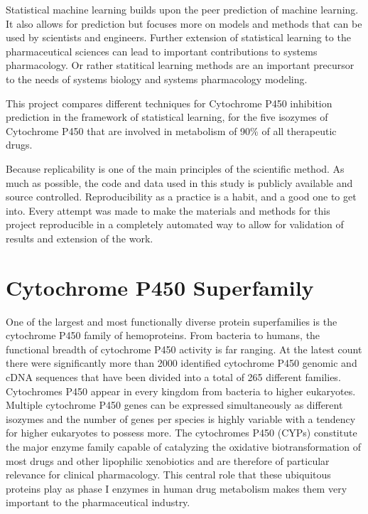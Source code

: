Statistical machine learning builds upon the peer prediction of machine learning. It also allows for prediction but focuses more on models and methods that can be used by scientists and engineers. \cite{James2013} Further extension of statistical learning to the pharmaceutical sciences can lead to important contributions to systems pharmacology. Or rather statitical learning methods are an important precursor to the needs of systems biology and systems pharmacology modeling.

This project compares different techniques for Cytochrome P450 inhibition prediction in the framework of statistical learning, for the five isozymes of Cytochrome P450 that are involved in metabolism of 90\% of all therapeutic drugs.

Because replicability is one of the main principles of the scientific method. As much as possible, the code and data used in this study is publicly available and source controlled. Reproducibility as a practice is a habit, and a good one to get into. Every attempt was made to make the materials and methods for this project reproducible in a completely automated way to allow for validation of results and extension of the work.

\section{Cytochrome P450 Superfamily}

One of the largest and most functionally diverse protein superfamilies is the cytochrome P450 family of hemoproteins. From bacteria to humans, the functional breadth of cytochrome P450 activity is far ranging. At the latest count there were significantly more than 2000 identified cytochrome P450 genomic and cDNA sequences that have been divided into a total of 265 different families. \cite{Danielson2002} Cytochromes P450 appear in every kingdom from bacteria to higher eukaryotes. Multiple cytochrome P450 genes can be expressed simultaneously as different isozymes and the number of genes per species is highly variable with a tendency for higher eukaryotes to possess more. The cytochromes P450 (CYPs) constitute the major enzyme family capable of catalyzing the oxidative biotransformation of most drugs and other lipophilic xenobiotics and are therefore of particular relevance for clinical pharmacology. This central role that these ubiquitous proteins play as phase I enzymes in human drug metabolism makes them very important to the pharmaceutical industry.

